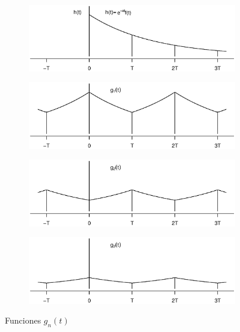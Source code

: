 \documentclass[11pt]{article}
\numberwithin{equation}{section} %
\begin{document}
\begin{figure}[htbp]
\centering

\begin{subfigure}[b]{\textwidth}
\centering
\includegraphics[width=\textwidth,trim=0 1.5cm 0 2.5cm]{ft.eps}
\end{subfigure}

\begin{subfigure}[b]{\textwidth}
\centering
\includegraphics[width=\textwidth,trim=0 1.5cm 0 2.5cm]{g1t.eps}
\end{subfigure}

\begin{subfigure}[b]{\textwidth}
\centering
\includegraphics[width=\textwidth,trim=0 1.5cm 0 2.5cm]{g2t.eps}
\end{subfigure}

\begin{subfigure}[b]{\textwidth}
\centering
\includegraphics[width=\textwidth,trim=0 1.5cm 0 2.5cm]{g3t.eps}
\end{subfigure}

\caption{Funciones $g_n(t)$}
\label{fourier}
\end{figure}
\end{document}
